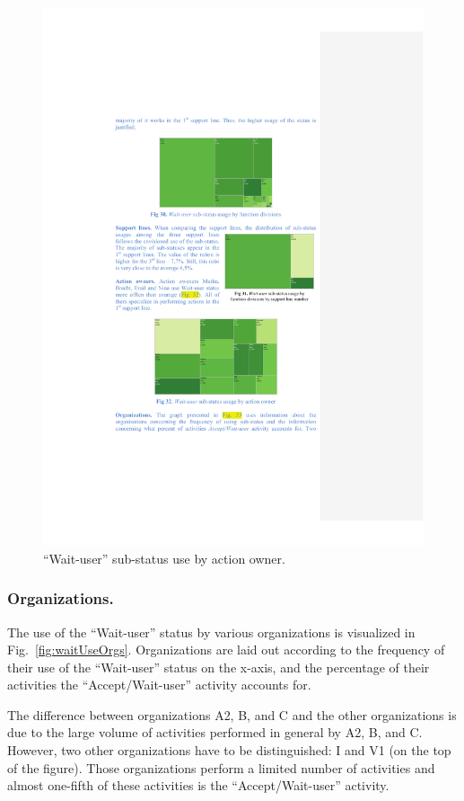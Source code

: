\documentclass[lnbip]{svmultln}
\begin{document}
\begin{figure}
  \begin{center}
    \includegraphics[width=.6\textwidth]{"figs/pic 34"}
  \end{center}
  \caption{``Wait-user'' sub-status use by action owner.}
  \label{fig:waitUsePerson}
\end{figure}


\subsubsection{Organizations.} The use of the ``Wait-user'' status by various organizations is visualized in Fig.~\ref{fig:waitUseOrgs}. Organizations are laid out according to the frequency of their use of the ``Wait-user'' status on the x-axis, and the percentage of their activities the ``Accept/Wait-user'' activity accounts for.

The difference between organizations A2, B, and C and the other organizations is due to the large volume of activities performed in general by A2, B, and C. However, two other organizations have to be distinguished: I and V1 (on the top of the figure). Those organizations perform a limited number of activities and almost one-fifth of these activities is the ``Accept/Wait-user'' activity.
 
\end{document}
